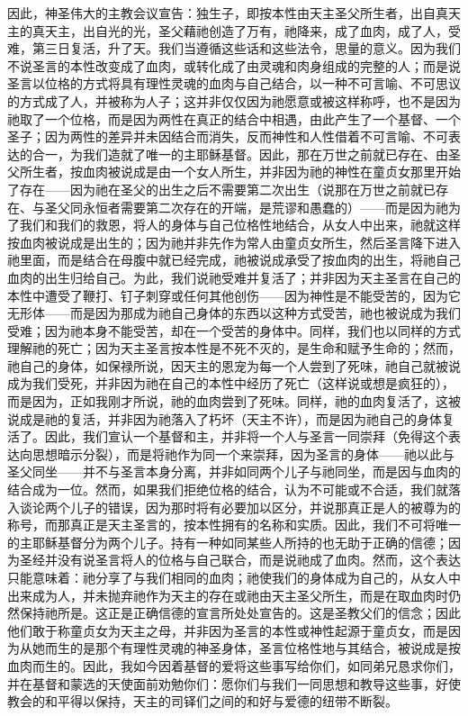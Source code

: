 因此，神圣伟大的主教会议宣告：独生子，即按本性由天主圣父所生者，出自真天主的真天主，出自光的光，圣父藉祂创造了万有，祂降来，成了血肉，成了人，受难，第三日复活，升了天。我们当遵循这些话和这些法令，思量的意义。因为我们不说圣言的本性改变成了血肉，或转化成了由灵魂和肉身组成的完整的人；而是说圣言以位格的方式将具有理性灵魂的血肉与自己结合，以一种不可言喻、不可思议的方式成了人，并被称为人子；这并非仅仅因为祂愿意或被这样称呼，也不是因为祂取了一个位格，而是因为两性在真正的结合中相遇，由此产生了一个基督、一个圣子；因为两性的差异并未因结合而消失，反而神性和人性借着不可言喻、不可表达的合一，为我们造就了唯一的主耶稣基督。因此，那在万世之前就已存在、由圣父所生者，按血肉被说成是由一个女人所生，并非因为祂的神性在童贞女那里开始了存在——因为祂在圣父的出生之后不需要第二次出生（说那在万世之前就已存在、与圣父同永恒者需要第二次存在的开端，是荒谬和愚蠢的）——而是因为祂为了我们和我们的救恩，将人的身体与自己位格性地结合，从女人中出来，祂就这样按血肉被说成是出生的；因为祂并非先作为常人由童贞女所生，然后圣言降下进入祂里面，而是结合在母腹中就已经完成，祂被说成承受了按血肉的出生，将祂自己血肉的出生归给自己。为此，我们说祂受难并复活了；并非因为天主圣言在自己的本性中遭受了鞭打、钉子刺穿或任何其他创伤——因为神性是不能受苦的，因为它无形体——而是因为那成为祂自己身体的东西以这种方式受苦，祂也被说成为我们受难；因为祂本身不能受苦，却在一个受苦的身体中。同样，我们也以同样的方式理解祂的死亡；因为天主圣言按本性是不死不灭的，是生命和赋予生命的；然而，祂自己的身体，如保禄所说，因天主的恩宠为每一个人尝到了死味，祂自己就被说成为我们受死，并非因为祂在自己的本性中经历了死亡（这样说或想是疯狂的），而是因为，正如我刚才所说，祂的血肉尝到了死味。同样，祂的血肉复活了，这被说成是祂的复活，并非因为祂落入了朽坏（天主不许），而是因为祂自己的身体复活了。因此，我们宣认一个基督和主，并非将一个人与圣言一同崇拜（免得这个表达向思想暗示分裂），而是将祂作为同一个来崇拜，因为圣言的身体——祂以此与圣父同坐——并不与圣言本身分离，并非如同两个儿子与祂同坐，而是因与血肉的结合成为一位。然而，如果我们拒绝位格的结合，认为不可能或不合适，我们就落入谈论两个儿子的错误，因为那时将有必要加以区分，并说那真正是人的被尊为的称号，而那真正是天主圣言的，按本性拥有的名称和实质。因此，我们不可将唯一的主耶稣基督分为两个儿子。持有一种如同某些人所持的也无助于正确的信德；因为圣经并没有说圣言将人的位格与自己联合，而是说祂成了血肉。然而，这个表达只能意味着：祂分享了与我们相同的血肉；祂使我们的身体成为自己的，从女人中出来成为人，并未抛弃祂作为天主的存在或祂由天主圣父所生，而是在取血肉时仍然保持祂所是。这正是正确信德的宣言所处处宣告的。这是圣教父们的信念；因此他们敢于称童贞女为天主之母，并非因为圣言的本性或神性起源于童贞女，而是因为从她而生的是那个有理性灵魂的神圣身体，圣言位格性地与其结合，被说成是按血肉而生的。因此，我如今因着基督的爱将这些事写给你们，如同弟兄恳求你们，并在基督和蒙选的天使面前劝勉你们：愿你们与我们一同思想和教导这些事，好使教会的和平得以保持，天主的司铎们之间的和好与爱德的纽带不断裂。\par

